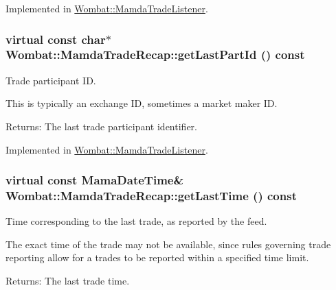 Implemented in \hyperlink{classWombat_1_1MamdaTradeListener_d8de6f0f0a88393c9f57d9627570ee96}{Wombat::Mamda\-Trade\-Listener}.\hypertarget{classWombat_1_1MamdaTradeRecap_67a37388f66bd17d38a51e72c09d9549}{
\subsubsection[getLastPartId]{\setlength{\rightskip}{0pt plus 5cm}virtual const char$\ast$ Wombat::Mamda\-Trade\-Recap::get\-Last\-Part\-Id () const}}
\label{classWombat_1_1MamdaTradeRecap_67a37388f66bd17d38a51e72c09d9549}


Trade participant ID. 

This is typically an exchange ID, sometimes a market maker ID.

\begin{Desc}
\item[Returns:]The last trade participant identifier. \end{Desc}


Implemented in \hyperlink{classWombat_1_1MamdaTradeListener_2e1bdae3c8609e4b8fe5709c0ea5c0f2}{Wombat::Mamda\-Trade\-Listener}.\hypertarget{classWombat_1_1MamdaTradeRecap_b589580af79ac95e51a3055014c99d2e}{
\subsubsection[getLastTime]{\setlength{\rightskip}{0pt plus 5cm}virtual const Mama\-Date\-Time\& Wombat::Mamda\-Trade\-Recap::get\-Last\-Time () const}}
\label{classWombat_1_1MamdaTradeRecap_b589580af79ac95e51a3055014c99d2e}


Time corresponding to the last trade, as reported by the feed. 

The exact time of the trade may not be available, since rules governing trade reporting allow for a trades to be reported within a specified time limit.

\begin{Desc}
\item[Returns:]The last trade time. \end{Desc}


